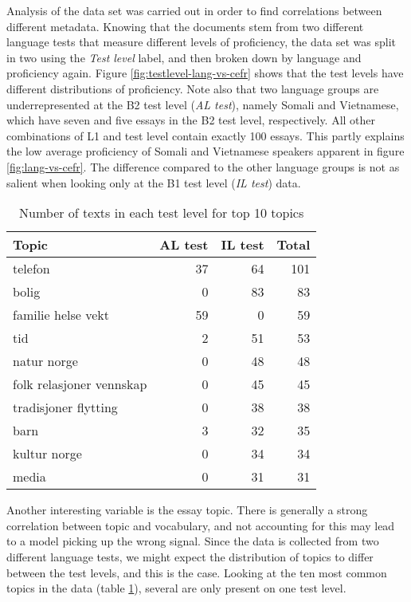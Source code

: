 Analysis of the data set was carried out in order to find correlations
between different metadata. Knowing that the documents stem from two
different language tests that measure different levels of proficiency, the
data set was split in two using the \emph{Test level} label, and then broken
down by language and proficiency again. Figure
\ref{fig:testlevel-lang-vs-cefr} shows that the test levels have different
distributions of proficiency. Note also that two language groups are
underrepresented at the B2 test level (\emph{AL test}), namely Somali and
Vietnamese, which have seven and five essays in the B2 test level,
respectively. All other combinations of L1 and test level contain exactly 100
essays. This partly explains the low average proficiency of Somali and
Vietnamese speakers apparent in figure \ref{fig:lang-vs-cefr}. The difference
compared to the other language groups is not as salient when looking only at
the B1 test level (\emph{IL test}) data.

\begin{table}
  \centering
  \begin{tabular}{lrrr}
    \toprule
    Topic                    & AL test & IL test & Total \\
    \midrule
    telefon                  &      37 &      64 &   101 \\
    bolig                    &       0 &      83 &    83 \\
    familie helse vekt       &      59 &       0 &    59 \\
    tid                      &       2 &      51 &    53 \\
    natur norge              &       0 &      48 &    48 \\
    folk relasjoner vennskap &       0 &      45 &    45 \\
    tradisjoner flytting     &       0 &      38 &    38 \\
    barn                     &       3 &      32 &    35 \\
    kultur norge             &       0 &      34 &    34 \\
    media                    &       0 &      31 &    31 \\
    \bottomrule
  \end{tabular}
  \caption{Number of texts in each test level for top 10 topics}
  \label{tab:texts-per-topic}
\end{table}

Another interesting variable is the essay topic. There is generally a strong
correlation between topic and vocabulary, and not accounting for this may
lead to a model picking up the wrong signal. Since the data is collected from
two different language tests, we might expect the distribution of topics to
differ between the test levels, and this is the case. Looking at the ten most
common topics in the data (table \ref{tab:texts-per-topic}), several are only
present on one test level.

